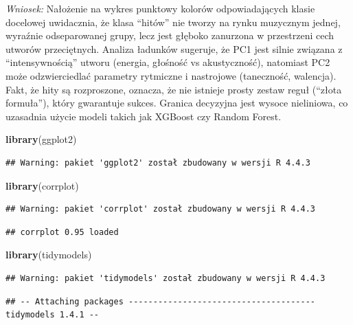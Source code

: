\documentclass[
]{article}
\newenvironment{Shaded}{\begin{snugshade}}{\end{snugshade}}
\newcommand{\FunctionTok}[1]{\textcolor[rgb]{0.13,0.29,0.53}{\textbf{#1}}}
\newcommand{\NormalTok}[1]{#1}
\begin{document}
\emph{Wniosek:} Nałożenie na wykres punktowy kolorów odpowiadających
klasie docelowej uwidacznia, że klasa ``hitów'' nie tworzy na rynku
muzycznym jednej, wyraźnie odseparowanej grupy, lecz jest głęboko
zanurzona w przestrzeni cech utworów przeciętnych. Analiza ładunków
sugeruje, że PC1 jest silnie związana z ``intensywnością'' utworu
(energia, głośność vs akustyczność), natomiast PC2 może odzwierciedlać
parametry rytmiczne i nastrojowe (taneczność, walencja). Fakt, że hity
są rozproszone, oznacza, że nie istnieje prosty zestaw reguł (``złota
formuła''), który gwarantuje sukces. Granica decyzyjna jest wysoce
nieliniowa, co uzasadnia użycie modeli takich jak XGBoost czy Random
Forest.

\begin{Shaded}
\begin{Highlighting}[]
\FunctionTok{library}\NormalTok{(ggplot2)}
\end{Highlighting}
\end{Shaded}

\begin{verbatim}
## Warning: pakiet 'ggplot2' został zbudowany w wersji R 4.4.3
\end{verbatim}

\begin{Shaded}
\begin{Highlighting}[]
\FunctionTok{library}\NormalTok{(corrplot)}
\end{Highlighting}
\end{Shaded}

\begin{verbatim}
## Warning: pakiet 'corrplot' został zbudowany w wersji R 4.4.3
\end{verbatim}

\begin{verbatim}
## corrplot 0.95 loaded
\end{verbatim}

\begin{Shaded}
\begin{Highlighting}[]
\FunctionTok{library}\NormalTok{(tidymodels)}
\end{Highlighting}
\end{Shaded}

\begin{verbatim}
## Warning: pakiet 'tidymodels' został zbudowany w wersji R 4.4.3
\end{verbatim}

\begin{verbatim}
## -- Attaching packages -------------------------------------- tidymodels 1.4.1 --
\end{verbatim}
\end{document}
